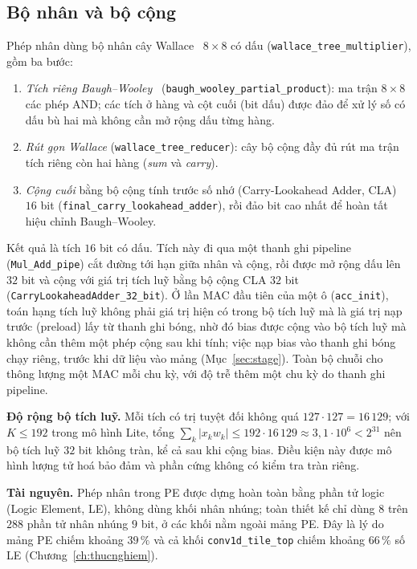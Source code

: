 \subsection{Bộ nhân và bộ cộng}
Phép nhân dùng bộ nhân cây Wallace~\cite{wallace1964} $8\times8$ có dấu (\texttt{wallace\_tree\_multiplier}), gồm ba bước:
\begin{enumerate}
  \item \emph{Tích riêng Baugh--Wooley}~\cite{baughwooley1973} (\texttt{baugh\_wooley\_partial\_product}): ma trận $8\times8$ các phép AND; các tích ở hàng và cột cuối (bit dấu) được đảo để xử lý số có dấu bù hai mà không cần mở rộng dấu từng hàng.
  \item \emph{Rút gọn Wallace} (\texttt{wallace\_tree\_reducer}): cây bộ cộng đầy đủ rút ma trận tích riêng còn hai hàng (\emph{sum} và \emph{carry}).
  \item \emph{Cộng cuối} bằng bộ cộng tính trước số nhớ (Carry-Lookahead Adder, CLA) $16$ bit (\texttt{final\_carry\_lookahead\_adder}), rồi đảo bit cao nhất để hoàn tất hiệu chỉnh Baugh--Wooley.
\end{enumerate}
Kết quả là tích $16$ bit có dấu.
Tích này đi qua một thanh ghi pipeline (\texttt{Mul\_Add\_pipe}) cắt đường tới hạn giữa nhân và cộng, rồi được mở rộng dấu lên $32$ bit và cộng với giá trị tích luỹ bằng bộ cộng CLA $32$ bit (\texttt{CarryLookaheadAdder\_32\_bit}).
Ở lần MAC đầu tiên của một ô (\texttt{acc\_init}), toán hạng tích luỹ không phải giá trị hiện có trong bộ tích luỹ mà là giá trị nạp trước (preload) lấy từ thanh ghi bóng, nhờ đó bias được cộng vào bộ tích luỹ mà không cần thêm một phép cộng sau khi tính; việc nạp bias vào thanh ghi bóng chạy riêng, trước khi dữ liệu vào mảng (Mục~\ref{sec:stage}).
Toàn bộ chuỗi cho thông lượng một MAC mỗi chu kỳ, với độ trễ thêm một chu kỳ do thanh ghi pipeline.

\textbf{Độ rộng bộ tích luỹ.} Mỗi tích có trị tuyệt đối không quá $127\cdot127=16\,129$; với $K\le192$ trong mô hình Lite, tổng $\sum_{k}|x_kw_k|\le192\cdot16\,129\approx3{,}1\cdot10^{6}<2^{31}$ nên bộ tích luỹ $32$ bit không tràn, kể cả sau khi cộng bias.
Điều kiện này được mô hình lượng tử hoá bảo đảm và phần cứng không có kiểm tra tràn riêng.

\textbf{Tài nguyên.} Phép nhân trong PE được dựng hoàn toàn bằng phần tử logic (Logic Element, LE), không dùng khối nhân nhúng; toàn thiết kế chỉ dùng $8$ trên $288$ phần tử nhân nhúng $9$ bit, ở các khối nằm ngoài mảng PE.
Đây là lý do mảng PE chiếm khoảng $39\,\%$ và cả khối \texttt{conv1d\_tile\_top} chiếm khoảng $66\,\%$ số LE (Chương~\ref{ch:thucnghiem}).

